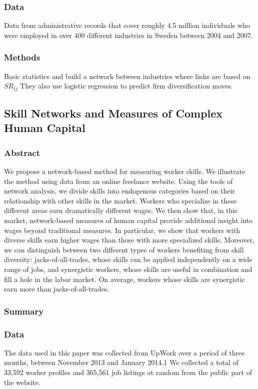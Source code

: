 \documentclass[12pt]{article}
\begin{document}
\subsubsection*{Data}
Data from administrative records that cover roughly 4.5 million individuals who were employed in over 400 different industries in Sweden between 2004 and 2007.
\subsubsection*{Methods}
Basic statistics and build a network between industries where links are based on $SR_{ij}$ They also use logistic regression to predict firm diversification moves.


\subsection*{Skill Networks and Measures of Complex Human Capital\cite{anderson2017skill}}

\subsubsection*{Abstract}
We propose a network-based method for measuring worker skills. We illustrate the method using data from an online freelance website. Using the tools of network analysis, we divide skills into endogenous categories based on their relationship with other skills in the market. Workers who specialize in these different areas earn dramatically different wages. We then show that, in this market, network-based measures of human capital provide additional insight into wages beyond traditional measures. In particular, we show that workers with diverse skills earn higher wages than those with more specialized skills. Moreover, we can distinguish between two different types of workers benefiting from skill diversity: jacks-of-all-trades, whose skills can be applied independently on a wide range of jobs, and synergistic workers, whose skills are useful in combination and fill a hole in the labor market. On average, workers whose skills are synergistic earn more than jacks-of-all-trades.

\subsubsection*{Summary}

\subsubsection*{Data}
The data used in this paper was collected from UpWork over a period of three months, between
November 2013 and January 2014.1 We collected a total of 33,592 worker profiles and 365,561 job listings at random from the public part of the website.
\end{document}
